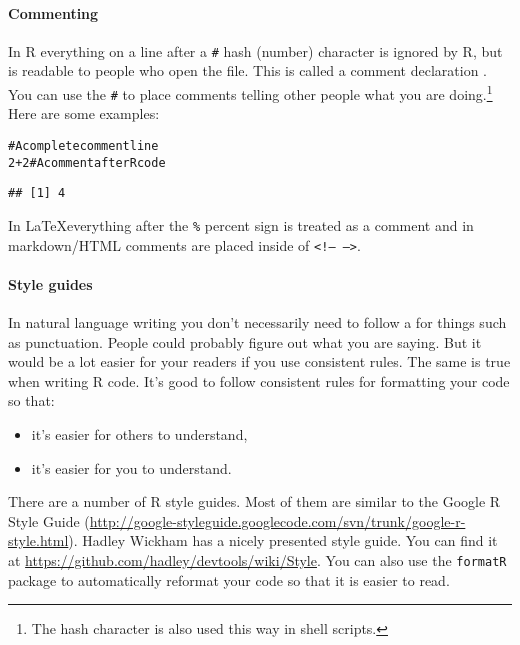 \documentclass[ChapterTOCs,krantz1]{krantz}\usepackage{graphicx, color}
\makeatletter
\newcommand{\hlcomment}[1]{\textcolor[rgb]{0.180392156862745,0.6,0.341176470588235}{#1}}%
\newenvironment{kframe}{%
 \def\at@end@of@kframe{}%
 \ifinner\ifhmode%
  \def\at@end@of@kframe{\end{minipage}}%
  \begin{minipage}{\columnwidth}%
 \fi\fi%
 \def\FrameCommand##1{\hskip\@totalleftmargin \hskip-\fboxsep
 \colorbox{shadecolor}{##1}\hskip-\fboxsep
     \hskip-\linewidth \hskip-\@totalleftmargin \hskip\columnwidth}%
 \MakeFramed {\advance\hsize-\width
   \@totalleftmargin\z@ \linewidth\hsize
   \@setminipage}}%
 {\par\unskip\endMakeFramed%
 \at@end@of@kframe}
\newenvironment{knitrout}{}{} %
\makeatother
\begin{document}
\paragraph{Commenting}
In R everything on a line after a {\tt{#}} hash (number) character is ignored by R, but is readable to people who open the file. This is called a comment declaration . You can use the {\tt{#}} to place comments telling other people what you are doing.\footnote{The hash character is also used this way in shell scripts.} Here are some examples:

\begin{knitrout}
\color{fgcolor}\begin{kframe}
\begin{alltt}
\hlcomment{# A complete comment line}
2 + 2  \hlcomment{# A comment after R code}
\end{alltt}
\begin{verbatim}
## [1] 4
\end{verbatim}
\end{kframe}
\end{knitrout}


\noindent In \LaTeX everything after the {\tt{\%}} percent sign is treated as a comment and in markdown/HTML comments are placed inside of {\tt{\textless !-- --\textgreater}}.

\paragraph{Style guides}
In natural language writing you don't necessarily need to follow a  for things such as punctuation. People could probably figure out what you are saying. But it would be a lot easier for your readers if you use consistent rules. The same is true when writing R code. It's good to follow consistent rules for formatting your code so that:

\begin{itemize}
    \item it's easier for others to understand,
    \item it's easier for you to understand.
\end{itemize}

There are a number of R style guides. Most of them are similar to the Google R Style Guide  (\url{http://google-styleguide.googlecode.com/svn/trunk/google-r-style.html}). Hadley Wickham  has a nicely presented style guide. You can find it at \url{https://github.com/hadley/devtools/wiki/Style}. You can also use the {\tt{formatR}}  package to automatically reformat your code so that it is easier to read.
\end{document}
